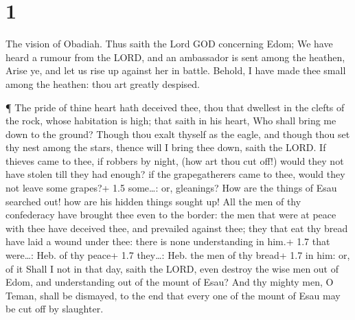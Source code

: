 \hypertarget{section}{%
\section{1}\label{section}}

 The vision of Obadiah. Thus saith the Lord GOD concerning
Edom; We have heard a rumour from the LORD, and an ambassador is sent
among the heathen, Arise ye, and let us rise up against her in battle.
 Behold, I have made thee small among the heathen: thou art
greatly despised.

 ¶ The pride of thine heart hath deceived thee, thou that
dwellest in the clefts of the rock, whose habitation is high; that saith
in his heart, Who shall bring me down to the ground?  Though
thou exalt thyself as the eagle, and though thou set thy nest among the
stars, thence will I bring thee down, saith the LORD.  If
thieves came to thee, if robbers by night, (how art thou cut off!) would
they not have stolen till they had enough? if the grapegatherers came to
thee, would they not leave some grapes?+ 1.5 some\ldots: or, gleanings?
 How are the things of Esau searched out! how are his hidden
things sought up!  All the men of thy confederacy have
brought thee even to the border: the men that were at peace with thee
have deceived thee, and prevailed against thee; they that eat thy bread
have laid a wound under thee: there is none understanding in him.+ 1.7
that were\ldots: Heb. of thy peace+ 1.7 they\ldots: Heb. the men of thy
bread+ 1.7 in him: or, of it  Shall I not in that day, saith
the LORD, even destroy the wise men out of Edom, and understanding out
of the mount of Esau?  And thy mighty men, O Teman, shall be
dismayed, to the end that every one of the mount of Esau may be cut off
by slaughter.

